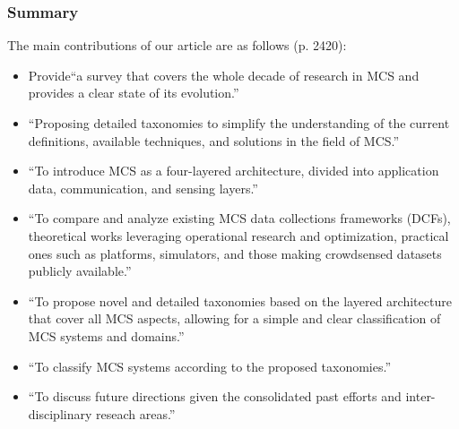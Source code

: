 \subsubsection*{Summary}
The main contributions of our article are as follows (p. 2420):
	\begin{itemize}
	\item Provide``a survey that covers the whole decade of research in MCS and provides a clear state of its evolution.''
	\item ``Proposing detailed taxonomies to simplify the understanding of the current definitions, available techniques, and solutions in the field of MCS.''
	\item ``To introduce MCS as a four-layered architecture, divided into application data, communication, and sensing layers.''
	\item ``To compare and analyze existing MCS data collections frameworks (DCFs), theoretical works leveraging operational research and optimization, practical ones such as platforms, simulators, and those making crowdsensed datasets publicly available.''
	\item ``To propose novel and detailed taxonomies based on the layered architecture that cover all MCS aspects, allowing for a simple and clear classification of MCS systems and domains.''
	\item ``To classify MCS systems according to the proposed taxonomies.''
	\item ``To discuss future directions given the consolidated past efforts and inter-disciplinary reseach areas.''
	\end{itemize}
